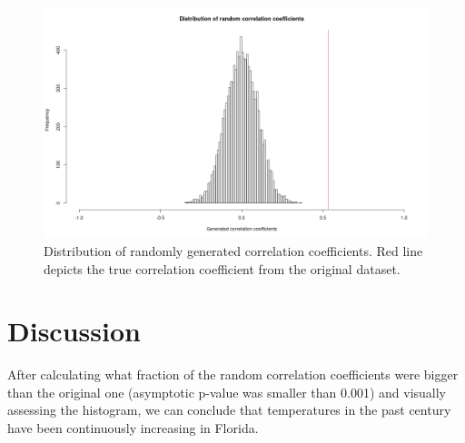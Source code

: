 \documentclass{article}
\begin{document}
\begin{figure}[H]
\centering
\includegraphics[scale=0.2]{../data/histogram1.png}
\caption{Distribution of randomly generated correlation coefficients. Red line depicts the true correlation coefficient from the original dataset.}
\end{figure}
    
    \section{Discussion}
    
    After calculating what fraction of the random correlation coefficients were bigger than the original one (asymptotic p-value was smaller than 0.001) and visually assessing the histogram, we can conclude that temperatures in the past century have been continuously increasing in Florida. 
\end{document}
